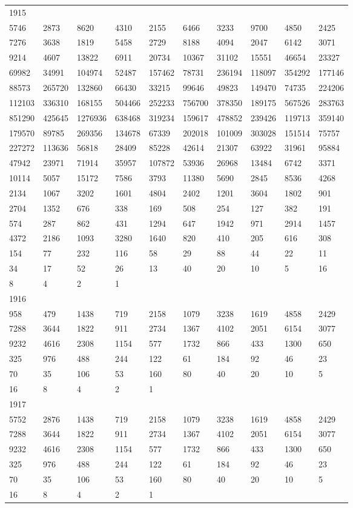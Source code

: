 \begin{longtable}{*{10}{l}}
1915&&&&&&&&&\\
5746& 2873& 8620& 4310& 2155& 6466& 3233& 9700& 4850& 2425\\
7276& 3638& 1819& 5458& 2729& 8188& 4094& 2047& 6142& 3071\\
9214& 4607& 13822& 6911& 20734& 10367& 31102& 15551& 46654& 23327\\
69982& 34991& 104974& 52487& 157462& 78731& 236194& 118097& 354292& 177146\\
88573& 265720& 132860& 66430& 33215& 99646& 49823& 149470& 74735& 224206\\
112103& 336310& 168155& 504466& 252233& 756700& 378350& 189175& 567526& 283763\\
851290& 425645& 1276936& 638468& 319234& 159617& 478852& 239426& 119713& 359140\\
179570& 89785& 269356& 134678& 67339& 202018& 101009& 303028& 151514& 75757\\
227272& 113636& 56818& 28409& 85228& 42614& 21307& 63922& 31961& 95884\\
47942& 23971& 71914& 35957& 107872& 53936& 26968& 13484& 6742& 3371\\
10114& 5057& 15172& 7586& 3793& 11380& 5690& 2845& 8536& 4268\\
2134& 1067& 3202& 1601& 4804& 2402& 1201& 3604& 1802& 901\\
2704& 1352& 676& 338& 169& 508& 254& 127& 382& 191\\
574& 287& 862& 431& 1294& 647& 1942& 971& 2914& 1457\\
4372& 2186& 1093& 3280& 1640& 820& 410& 205& 616& 308\\
154& 77& 232& 116& 58& 29& 88& 44& 22& 11\\
34& 17& 52& 26& 13& 40& 20& 10& 5& 16\\
8& 4& 2& 1& \\

1916&&&&&&&&&\\
958& 479& 1438& 719& 2158& 1079& 3238& 1619& 4858& 2429\\
7288& 3644& 1822& 911& 2734& 1367& 4102& 2051& 6154& 3077\\
9232& 4616& 2308& 1154& 577& 1732& 866& 433& 1300& 650\\
325& 976& 488& 244& 122& 61& 184& 92& 46& 23\\
70& 35& 106& 53& 160& 80& 40& 20& 10& 5\\
16& 8& 4& 2& 1& \\

1917&&&&&&&&&\\
5752& 2876& 1438& 719& 2158& 1079& 3238& 1619& 4858& 2429\\
7288& 3644& 1822& 911& 2734& 1367& 4102& 2051& 6154& 3077\\
9232& 4616& 2308& 1154& 577& 1732& 866& 433& 1300& 650\\
325& 976& 488& 244& 122& 61& 184& 92& 46& 23\\
70& 35& 106& 53& 160& 80& 40& 20& 10& 5\\
16& 8& 4& 2& 1& \\


\end{longtable}
